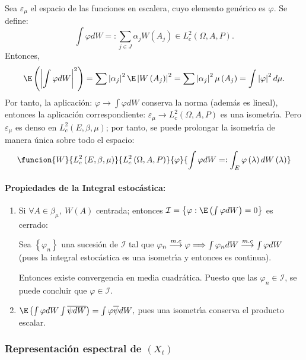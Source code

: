 Sea $\varepsilon_{\mu }$ el espacio de las funciones en escalera, cuyo elemento gen\'{e}rico es $\varphi $. Se define:
\[
\int {\varphi dW} =:\sum_{j\in J} {\alpha_{j}W\left( A_{j} \right)} 
\in L_{c}^{2}\left(\Omega,A,P \right).
\]
Entonces,
\[
\E\left( \left| \int {\varphi dW} \right|^{2} \right)=\sum \left| \alpha_{j} 
\right|^{2} \E\left| W\left( A_{j} \right) \right|^{2}=\sum \left| \alpha 
_{j} \right|^{2} \mu \left( A_{j} \right)=\int \left| \varphi \right|^{2} 
d\mu.
\]
Por tanto, la aplicaci\'{o}n: $\varphi \to \int {\varphi dW} $ conserva la norma (adem\'{a}s es lineal), entonces la aplicaci\'{o}n correspondiente: $\varepsilon_{\mu }\to L_{c}^{2}\left(\Omega,A,P \right)$ es una isometr\'{\i}a. Pero $\varepsilon_{\mu }$ es denso en $L_{c}^{2}\left( E,\beta ,\mu \right)$; por tanto, se puede prolongar la isometr\'{\i}a de 
manera \'{u}nica sobre todo el espacio:
\[
\funcion{W}{L_{c}^{2}\left( E,\beta ,\mu \right)}{L_{c}^{2}\left(\Omega,A,P \right)}{\varphi}{\displaystyle\int {\varphi dW} =:\int_E {\varphi 
\left( \lambda \right)dW\left( \lambda \right)} }
\]

\paragraph{Propiedades de la Integral estoc\'{a}stica:}

\begin{enumerate}
\item Si $\forall A\in \beta_{\mu },\ W(A)$ centrada; entonces $\mathcal{I}=\left\{ \varphi :\E\left( \int {\varphi dW} \right)=0 \right\}$ es cerrado:

Sea $\left\{ \varphi_{n} \right\}$ una sucesi\'{o}n de $\mathcal{I}$ tal que $\varphi_{n}\buildrel {m.c} \over \longrightarrow \varphi \Longrightarrow \int \varphi_{n} dW\buildrel {m.c} \over \longrightarrow \int {\varphi dW} $ (pues la 
integral estoc\'{a}stica es una isometr\'{\i}a y entonces es continua).

Entonces existe convergencia en media cuadr\'{a}tica. Puesto que las $\varphi_{n}\in \mathcal{I}$, se puede concluir que $\varphi \in \mathcal{I}$.

\item $\E\left( \int {\varphi dW} \int \overline{\psi dW} \right)=\int {\varphi \overline{\psi }dW} ,$ pues una isometr\'{\i}a conserva el producto escalar.
\end{enumerate}

\subsubsection{Representaci\'{o}n espectral de $\left(X_{t} \right)$ }

